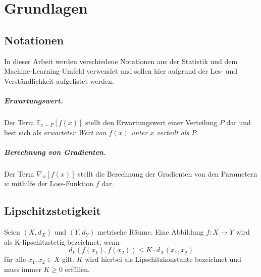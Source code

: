 \chapter{Grundlagen}\label{chapter:basics}
\section{Notationen}
In dieser Arbeit werden verschiedene Notationen aus der Statistik und dem
Machine-Learning-Umfeld verwendet und sollen hier aufgrund der Les- und
Verständlichkeit aufgelistet werden.

\paragraph{Erwartungswert.}
Der Term $\mathbb{E}_{x \sim P}\left[f(x)\right]$ stellt den Erwartungswert
einer Verteilung $P$ dar und liest sich als \textit{erwarteter Wert von
$f(x)$ unter $x$ verteilt als $P$}.

\paragraph{Berechnung von Gradienten.}
Der Term $\nabla_w\left[f(x)\right]$ stellt die Berechnung der Gradienten von
den Parametern $w$ mithilfe der Loss-Funktion $f$ dar.

\section{Lipschitzstetigkeit}
\begin{definition}[K-Lipschitzstetigkeit]
Seien $(X, d_X)$ und $(Y, d_Y)$ metrische Räume. Eine Abbildung $f: X \to Y$
wird als K-lipschitzstetig bezeichnet, wenn
\[
    d_Y(f(x_1), f(x_2)) \leq K \cdot d_X(x_1, x_2)
\]
für alle $x_1, x_2 \in X$ gilt. $K$ wird hierbei als Lipschitzkonstante
bezeichnet und muss immer $K \geq 0$ erfüllen.
\end{definition}

